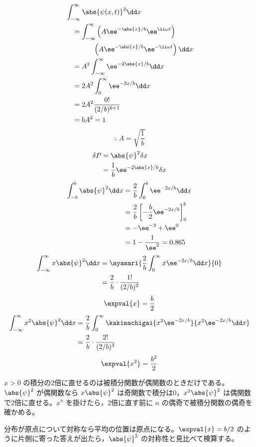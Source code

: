 \begin{align*}
&\int_{-\infty}^{\infty}\abs{\psi(x,t)}^{2}\dd x\\
&\quad=\int_{-\infty}^{\infty}\left(A\ee^{-\abs{x}/b}\ee^{\ii\omega t}\right)\\
&\qquad\qquad\left(A\ee^{-\abs{x}/b}\ee^{-\ii\omega t}\right)\dd x\\
&\quad=A^{2}\int_{-\infty}^{\infty}\ee^{-2\abs{x}/b}\dd x\\
&\quad=2A^{2}\int_{0}^{\infty}\ee^{-2x/b}\dd x\\
&\quad=2A^{2}\frac{0!}{(2/b)^{0+1}}\\
&\quad=bA^{2}=1
\end{align*}
\[ \therefore\ A=\sqrt{\frac{1}{b}} \]
\begin{align*}
\delta P&=\abs{\psi}^{2}\delta x\\
&=\frac{1}{b}\ee^{-2\abs{x}/b}\delta x
\end{align*}
\begin{align*}
\int_{-b}^{b}\abs{\psi}^{2}\dd x&=\frac{2}{b}\int_{0}^{b}\ee^{-2x/b}\dd x\\
&=\frac{2}{b}\left[-\frac{b}{2}\ee^{-2x/b}\right]_{0}^{b}\\
&=-\ee^{-2}+\ee^{0}\\
&=1-\frac{1}{\ee^{2}}=0.865
\end{align*}
\begin{align*}
\int_{-\infty}^{\infty}x\abs{\psi}^{2}\dd x&=\ayamari{\frac{2}{b}\int_{0}^{\infty}x\ee^{-2x/b}\dd x}{0}\\
&=\frac{2}{b}\cdot\frac{1!}{(2/b)^{2}}
\end{align*}
\[ \expval{x}=\frac{b}{2} \]
\begin{align*}
\int_{-\infty}^{\infty}x^{2}\abs{\psi}^{2}\dd x&=\frac{2}{b}\int_{0}^{\infty}\kakimachigai{x^{2}\ee^{-2x/b}}{x^{2}\ee^{-2x/b}\dd x}\\
&=\frac{2}{b}\cdot\frac{2!}{(2/b)^{3}}
\end{align*}
\[ \expval{x^{2}}=\frac{b^{2}}{2} \]
\item $x>0$ の積分の2倍に直せるのは被積分関数が偶関数のときだけである。$\abs{\psi}^{2}$ が偶関数なら $x\abs{\psi}^{2}$ は奇関数で積分は0，$x^{2}\abs{\psi}^{2}$ は偶関数で2倍に直せる。$x^{n}$ を掛けたら，2倍に直す前に $n$ の偶奇で被積分関数の偶奇を確かめる。
\item 分布が原点について対称なら平均の位置は原点になる。$\expval{x}=b/2$ のように片側に寄った答えが出たら，$\abs{\psi}^{2}$ の対称性と見比べて検算する。

